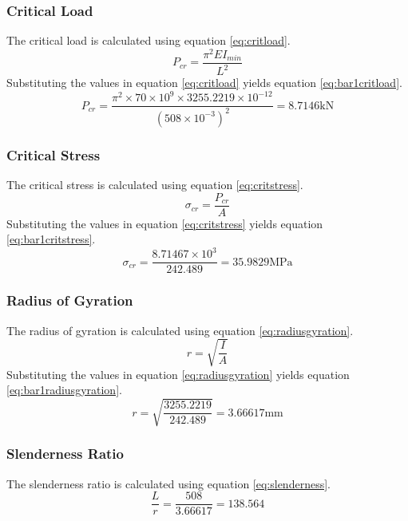 \documentclass[12pt, titlepage]{article}
\begin{document}
\subsubsection{Critical Load}
The critical load is calculated using equation \ref{eq:critload}.
\begin{equation}
    \label{eq:critload}
    P_{cr} = \frac{\pi^2 EI_{min}}{L^2}
\end{equation}
Substituting the values in equation \ref{eq:critload} yields equation
\ref{eq:bar1critload}.
\begin{equation}
    \label{eq:bar1critload}
    P_{cr} = \frac{\pi^2 \times 70 \times 10^9 \times 3255.2219 \times 10^{-12}}{(508 \times 10^{-3})^2} = 8.7146 \mathrm{kN}
\end{equation}
\subsubsection{Critical Stress}
The critical stress is calculated using equation \ref{eq:critstress}.
\begin{equation}
    \label{eq:critstress}
    \sigma_{cr} = \frac{P_{cr}}{A}
\end{equation}
Substituting the values in equation \ref{eq:critstress} yields equation
\ref{eq:bar1critstress}.
\begin{equation}
    \label{eq:bar1critstress}
    \sigma_{cr} = \frac{8.71467 \times 10^3}{242.489} = 35.9829 \mathrm{MPa}
\end{equation}
\subsubsection{Radius of Gyration}
The radius of gyration is calculated using equation \ref{eq:radiusgyration}.
\begin{equation}
    \label{eq:radiusgyration}
    r = \sqrt{\frac{I}{A}}
\end{equation}
Substituting the values in equation \ref{eq:radiusgyration} yields equation
\ref{eq:bar1radiusgyration}.
\begin{equation}
    \label{eq:bar1radiusgyration}
    r = \sqrt{\frac{3255.2219}{242.489}} = 3.66617 \mathrm{mm}
\end{equation}
\subsubsection{Slenderness Ratio}
The slenderness ratio is calculated using equation \ref{eq:slenderness}.
\begin{equation}
    \label{eq:slenderness}
    \frac{L}{r} = \frac{508}{3.66617} = 138.564
\end{equation}
\end{document}
